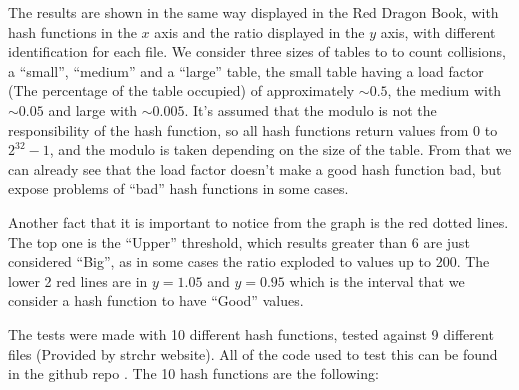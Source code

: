 The results are shown in the same way displayed in the Red Dragon Book, with hash functions in the \( x \) axis and the ratio displayed in the \( y \) axis, with different identification for each file. We consider three sizes of tables to to count collisions, a ``small'', ``medium'' and a ``large'' table, the small table having a load factor (The percentage of the table occupied) of approximately \( \sim 0.5 \), the medium with \( \sim 0.05 \) and large with \( \sim 0.005 \). It's assumed that the modulo is not the responsibility of the hash function, so all hash functions return values from 0 to \( 2^{32} - 1 \), and the modulo is taken depending on the size of the table. From that we can already see that the load factor doesn't make a good hash function bad, but expose problems of ``bad'' hash functions in some cases. 

Another fact that it is important to notice from the graph is the red dotted lines. The top one is the ``Upper'' threshold, which results greater than 6 are just considered ``Big'', as in some cases the ratio exploded to values up to 200. The lower 2 red lines are in \( y = 1.05 \) and \( y = 0.95 \) which is the interval that we consider a hash function to have ``Good'' values. 

The tests were made with 10 different hash functions, tested against 9 different files (Provided by strchr website). All of the code used to test this can be found in the github repo \citep{GithubRepo}. The 10 hash functions are the following:

